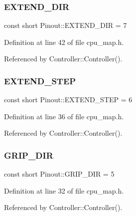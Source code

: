 \subsubsection{\texorpdfstring{E\+X\+T\+E\+N\+D\+\_\+\+D\+IR}{EXTEND\_DIR}}
{\footnotesize\ttfamily const short Pinout\+::\+E\+X\+T\+E\+N\+D\+\_\+\+D\+IR = 7\hspace{0.3cm}{\ttfamily [static]}}



Definition at line 42 of file cpu\+\_\+map.\+h.



Referenced by Controller\+::\+Controller().

\mbox{\label{class_pinout_a69dd96e739859d5cc64e477ca844276b}} 
\subsubsection{\texorpdfstring{E\+X\+T\+E\+N\+D\+\_\+\+S\+T\+EP}{EXTEND\_STEP}}
{\footnotesize\ttfamily const short Pinout\+::\+E\+X\+T\+E\+N\+D\+\_\+\+S\+T\+EP = 6\hspace{0.3cm}{\ttfamily [static]}}



Definition at line 36 of file cpu\+\_\+map.\+h.



Referenced by Controller\+::\+Controller().

\mbox{\label{class_pinout_a49466f79a0074d31c74885c4876693de}} 
\subsubsection{\texorpdfstring{G\+R\+I\+P\+\_\+\+D\+IR}{GRIP\_DIR}}
{\footnotesize\ttfamily const short Pinout\+::\+G\+R\+I\+P\+\_\+\+D\+IR = 5\hspace{0.3cm}{\ttfamily [static]}}



Definition at line 32 of file cpu\+\_\+map.\+h.



Referenced by Controller\+::\+Controller().


